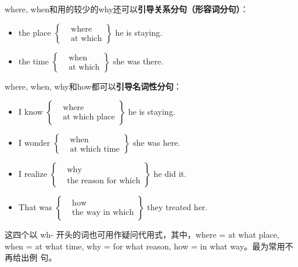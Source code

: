 where, when和用的较少的why还可以\textbf{引导关系分句（形容词分句）}：
\begin{itemize}
\item the place
    $\left\{
      \begin{aligned}
        &\text{where}\\
        &\text{at which}
      \end{aligned}
      \right\} $ he is staying.

\item the time
    $\left\{
      \begin{aligned}
        &\text{when}\\
        &\text{at which}
      \end{aligned}
      \right\} $ she was there.
\end{itemize}

where, when, why和how都可以\textbf{引导名词性分句}：
\begin{itemize}
\item I know
    $\left\{
      \begin{aligned}
        &\text{where}\\
        &\text{at which place}
      \end{aligned}
      \right\} $ he is staying.

\item I wonder
    $\left\{
      \begin{aligned}
        &\text{when}\\
        &\text{at which time}
      \end{aligned}
      \right\} $ she was here.

\item I realize
    $\left\{
      \begin{aligned}
        &\text{why}\\
        &\text{the reason for which}
      \end{aligned}
      \right\} $ he did it.

\item That was
    $\left\{
      \begin{aligned}
        &\text{how}\\
        &\text{the way in which}
      \end{aligned}
      \right\} $ they treated her.
\end{itemize}

这四个以 wh- 开头的词也可用作疑问代用式，其中，where = at what place, when =
at what time, why = for what reason, how = in what way。最为常用不再给出例
句。


